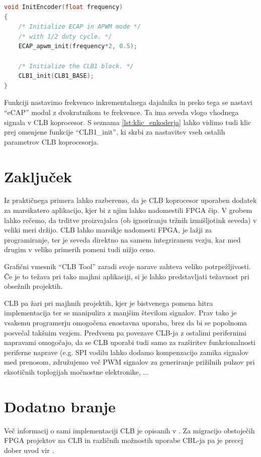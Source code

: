 \documentclass[a4paper]{article}
\begin{document}
\begin{sloppypar}
\begin{lstlisting}[language=C,
                   caption={Implementacija funkcije za nastavitev 
                            inkrementalnega dajalnika},
                   label={lst:klic_enkoderja}]
void InitEncoder(float frequency)
{
    /* Initialize ECAP in APWM mode */
    /* with 1/2 duty cycle. */
    ECAP_apwm_init(frequency*2, 0.5);

    /* Initialize the CLB1 block. */
    CLB1_init(CLB1_BASE);
}
\end{lstlisting}

Funkciji nastavimo frekvenco inkrementalnega dajalnika in preko tega se nastavi
``eCAP'' modul z dvokratnikom te frekvence. Ta ima seveda vlogo vhodnega
signala v CLB koprocesor. S seznama \ref{lst:klic_enkoderja} lahko vidimo tudi
klic prej omenjene funkcije ``CLB1\_init'', ki skrbi za nastavitev vseh ostalih
parametrov CLB koprocesorja.

\section{Zaključek}
Iz praktičnega primera lahko razberemo, da je CLB koprocesor uporaben
dodatek za marsikatero aplikacijo, kjer bi z njim lahko nadomestili FPGA čip. V
grobem lahko rečemo, da trditve proizvajalca (ob ignoriranju tržnih
izmišljotink seveda) v veliki meri držijo. CLB lahko marsikje nadomesti FPGA,
je lažji za programiranje, ter je seveda direktno na samem integriranem vezju,
kar med drugim v veliko primerih pomeni tudi nižjo ceno.

Grafični vmesnik ``CLB Tool'' zaradi svoje narave zahteva veliko
potrpežljivosti. Če je to težava pri tako majhni aplikaciji, si je lahko
predstavljati težavnost pri obsežnih projektih.

CLB pa žari pri majhnih projektih, kjer je bistvenega pomena hitra
implementacija ter se manipulira z manjšim številom signalov. Prav tako je
vsakemu programerju omogočena enostavna uporaba, brez da bi se popolnoma
posvečal takšnim vezjem. Predvsem pa povezave CLB-ja z ostalimi perifernimi
napravami \cite{fpga-to-clb} omogočajo, da se CLB uporabi tudi samo za
razširitev funkcionalnosti periferne naprave (e.g. SPI vodilu lahko dodamo
kompenzacijo zamika signalov med prenosom, združujemo več PWM signalov za generiranje prižilnih pulzov pri eksotičnih toplogijah močnostne elektronike, ...

\section{Dodatno branje}
Več informacij o sami implementaciji CLB je opisanih v \cite{clb-designing}. Za
migracijo obstoječih FPGA projektov na CLB in različnih možnostih uporabe
CBL-ja pa je precej dober uvod vir \cite{fpga-to-clb}.


\printbibliography



\end{sloppypar}
\end{document}
